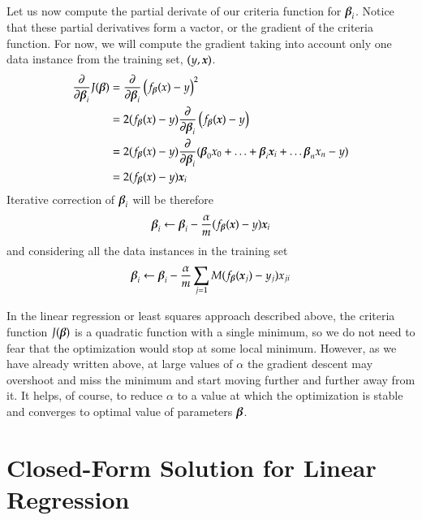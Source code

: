 \begin{refsection}
Let us now compute the partial derivate of our criteria function for $\boldsymbol{\beta}_i$. Notice that these partial derivatives form a vactor, or the gradient of the criteria function. For now, we will compute the gradient taking into account only one data instance from the training set, $(y, \boldsymbol{x})$. 
%
\begin{align}
{\partial\over\partial\boldsymbol{\beta}_i} J(\boldsymbol{\beta}) & = 
{\partial\over\partial\boldsymbol{\beta}_i} \left(f_{\boldsymbol{\beta}}(x)-y\right)^2 \\
& = 2(f_{\boldsymbol{\beta}}(x)-y){\partial\over\partial\boldsymbol{\beta}_i}\left(f_{\boldsymbol{\beta}}(\boldsymbol{x})-y\right) \\
& = 2 (f_{\boldsymbol{\beta}}(x)-y){\partial\over\partial\boldsymbol{\beta}_i}(\boldsymbol{\beta}_0 x_0 + \ldots + \boldsymbol{\beta}_i \boldsymbol{x}_i + \ldots \boldsymbol{\beta}_n x_n - y) \\
& = 2 (f_{\boldsymbol{\beta}}(x)-y)\boldsymbol{x}_i
\end{align}
%
Iterative correction of $\boldsymbol{\beta}_i$ will be therefore
\begin{equation}
  \boldsymbol{\beta}_i\leftarrow\boldsymbol{\beta}_i-{\alpha\over m}(f_{\boldsymbol{\beta}}(\boldsymbol{x})-y) \boldsymbol{x}_i
\end{equation}
and considering all the data instances in the training set
\begin{equation}
  \boldsymbol{\beta}_i\leftarrow\boldsymbol{\beta}_i-{\alpha\over m}\sum_{j=1}M(f_{\boldsymbol{\beta}}(\boldsymbol{x}_j)-y_j)x_{ji}
\end{equation}

In the linear regression or least squares approach described above, the criteria function $J(\boldsymbol{\beta})$ is a quadratic function with a single minimum, so we do not need to fear that the optimization would stop at some local minimum. However, as we have already written above, at large values of $\alpha$ the gradient descent may overshoot and miss the minimum and start moving further and further away from it. It helps, of course, to reduce $\alpha$ to a value at which the optimization is stable and converges to optimal value of parameters $\boldsymbol{\beta}$.

\section{Closed-Form Solution for Linear Regression}


\end{refsection}
